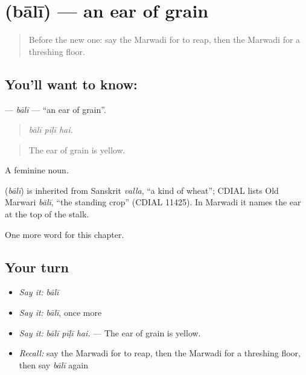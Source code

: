 \section[\texorpdfstring{\mw{बाली} (bālī)}{बाली (bālī)}]{ (bālī) — an ear of grain}

\label{lesson:MW-C240-bali}



\begin{quote}
Before the new one: say the Marwadi for to reap, then the Marwadi for a threshing floor.
\end{quote}

\subsection*{You'll want to know: }
\textbf{} — \emph{bālī} — \textquotedblleft{}an ear of grain\textquotedblright{}.

\begin{quote}
  
\end{quote}

\begin{quote}
\emph{bālī pīḷī hai.}
\end{quote}

\begin{quote}
The ear of grain is yellow.
\end{quote}

A feminine noun.

\begin{cousinweb}
\textbf{} (\emph{bālī}) is inherited from Sanskrit \emph{valla}, \textquotedblleft{}a kind of wheat\textquotedblright{}; CDIAL lists Old Marwari \emph{bālī}, \textquotedblleft{}the standing crop\textquotedblright{} (CDIAL 11425). In Marwadi it names the ear at the top of the stalk.
\end{cousinweb}

\begin{grammarlens}[title={What you've built}]
One more word for this chapter.
\end{grammarlens}

\subsection*{Your turn}
\begin{itemize}
\raggedright
  \item \emph{Say it:} \emph{bālī}
  \item \emph{Say it:} \emph{bālī}, once more
  \item \emph{Say it:} \emph{bālī pīḷī hai.} — The ear of grain is yellow.
  \item \emph{Recall:} say the Marwadi for to reap, then the Marwadi for a threshing floor, then say \emph{bālī} again
\end{itemize}

